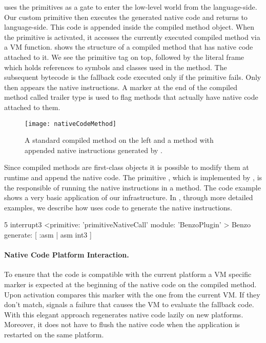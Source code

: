 \B uses the primitives as a gate to enter the low-level world from the language-side.
Our custom primitive then executes the generated native code and returns to language-side. 
This code is appended inside the compiled method object.
When the primitive is activated, it  accesses the currently executed compiled method via a VM function. 
 shows the structure of a \ST compiled method that has native code attached to it.
We see the primitive tag on top, followed by the literal frame which holds references to symbols and classes used in the method.
The subsequent \ST bytecode is the fallback code executed only if the primitive fails. Only then appears the native instructions.
A marker at the end of the compiled method called trailer type is used to flag methods that actually have native code attached to them.
%
\begin{figure}[ht]
	\centering
	\texttt{[image: nativeCodeMethod]}
	\caption{A standard \ST compiled method on the left and a method with appended native instructions generated by \B.}
\end{figure}

Since compiled methods are first-class objects it is possible to modify them at runtime and append the native code.
The primitive , which is implemented by \B, is the responsible of running the native instructions in a \ST method.
The code example  shows a very basic application of our infrastructure.
In , through more detailed examples, we describe how \B uses \ST code to generate the native instructions.
%
\begin{stcode}[label={lst:basic-native-code}, caption={\ST method using \B for very basic low-level debugging.}, escapeinside={@}{@}]{5}
interrupt3
	<primitive: 'primitiveNativeCall' 
	 module: 'BenzoPlugin' >
	Benzo generate: [ :asm | asm int3 ]
\end{stcode}

\paragraph{Native Code Platform Interaction.}

To ensure that the code is compatible with the current platform a VM specific marker is expected at the beginning of the native code on the compiled method.
Upon activation \B compares this marker with the one from the current VM.
If they don't match, \B signals a failure that causes the VM to evaluate the fallback \ST code.
With this elegant approach \B regenerates native code lazily on new platforms.
Moreover, it does not have to flush the native code when the application is restarted on the same platform.

